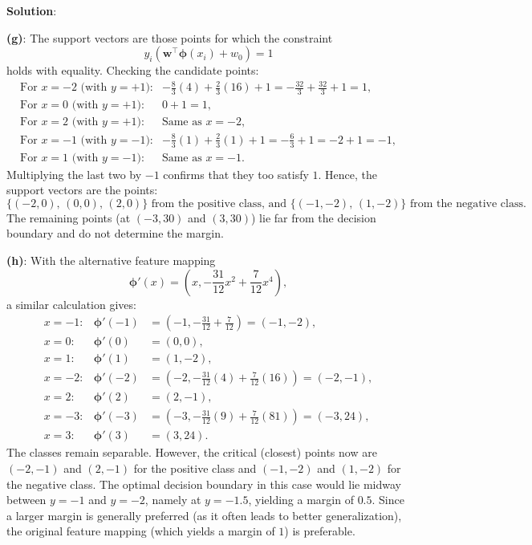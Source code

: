 \documentclass[submit]{../harvardml}
\newenvironment{solution}{
    \vspace{2mm}
    \color{blue}\noindent\textbf{Solution}:
}{}
\begin{document}
\begin{solution}
\textbf{(g)}: The support vectors are those points for which the constraint
\[
y_i\left(\mathbf{w}^\top\boldsymbol{\phi}(x_i) + w_0\right)=1
\]
holds with equality. Checking the candidate points:
\[
\begin{array}{rl}
\text{For } x=-2 \text{ (with } y=+1\text{):} & -\frac{8}{3}(4)+\frac{2}{3}(16)+1 = -\frac{32}{3}+\frac{32}{3}+1 = 1,\\[1mm]
\text{For } x=0 \text{ (with } y=+1\text{):} & 0+1 = 1,\\[1mm]
\text{For } x=2 \text{ (with } y=+1\text{):} & \text{Same as } x=-2,\\[1mm]
\text{For } x=-1 \text{ (with } y=-1\text{):} & -\frac{8}{3}(1)+\frac{2}{3}(1)+1 = -\frac{6}{3}+1 = -2+1=-1,\\[1mm]
\text{For } x=1 \text{ (with } y=-1\text{):} & \text{Same as } x=-1.
\end{array}
\]
Multiplying the last two by $-1$ confirms that they too satisfy $1$. Hence, the support vectors are the points:
\[
\{(-2,0),\,(0,0),\,(2,0)\} \text{ from the positive class, and } \{(-1,-2),\,(1,-2)\} \text{ from the negative class}.
\]
The remaining points (at $(-3,30)$ and $(3,30)$) lie far from the decision boundary and do not determine the margin.

\textbf{(h)}: With the alternative feature mapping
\[
\boldsymbol{\phi}'(x) = \left(x, -\frac{31}{12}x^2+\frac{7}{12}x^4\right),
\]
a similar calculation gives:
\[
\begin{array}{rcl}
x=-1: & \boldsymbol{\phi}'(-1) &= (-1, -\tfrac{31}{12}+\tfrac{7}{12}) = (-1,-2),\\[1mm]
x=0:  & \boldsymbol{\phi}'(0)  &= (0,0),\\[1mm]
x=1:  & \boldsymbol{\phi}'(1)  &= (1,-2),\\[1mm]
x=-2: & \boldsymbol{\phi}'(-2) &= (-2, -\tfrac{31}{12}(4)+\tfrac{7}{12}(16)) = (-2,-1),\\[1mm]
x=2:  & \boldsymbol{\phi}'(2)  &= (2,-1),\\[1mm]
x=-3: & \boldsymbol{\phi}'(-3) &= (-3, -\tfrac{31}{12}(9)+\tfrac{7}{12}(81)) = (-3,24),\\[1mm]
x=3:  & \boldsymbol{\phi}'(3)  &= (3,24).
\end{array}
\]
The classes remain separable. However, the critical (closest) points now are $(-2,-1)$ and $(2,-1)$ for the positive class and $(-1,-2)$ and $(1,-2)$ for the negative class. The optimal decision boundary in this case would lie midway between $y=-1$ and $y=-2$, namely at $y=-1.5$, yielding a margin of $0.5$. Since a larger margin is generally preferred (as it often leads to better generalization), the original feature mapping (which yields a margin of $1$) is preferable.
\end{solution}
\end{document}
